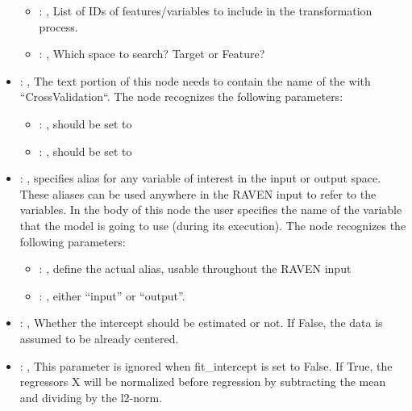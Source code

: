 \begin{itemize}
\begin{itemize}
        \item {}: , 
          List of IDs of features/variables to include in the transformation process.

        \item {}: , 
          Which space to search? Target or Feature?
      \end{itemize}

    \item {}: , 
      The text portion of this node needs to contain the name of the  with
               ``CrossValidation``.
      The  node recognizes the following parameters:
        \begin{itemize}
          \item {}: , 
            should be set to 
          \item {}: , 
            should be set to 
      \end{itemize}

    \item {}: , 
      specifies alias for         any variable of interest in the input or output space. These
      aliases can be used anywhere in the RAVEN input to         refer to the variables. In the body
      of this node the user specifies the name of the variable that the model is going to use
      (during its execution).
      The  node recognizes the following parameters:
        \begin{itemize}
          \item {}: , 
            define the actual alias, usable throughout the RAVEN input
          \item {}: , 
            either ``input'' or ``output''.
      \end{itemize}

    \item {}: , 
      Whether the intercept should be estimated or not. If False,
      the data is assumed to be already centered.

    \item {}: , 
      This parameter is ignored when fit\_intercept is set to False. If True,
      the regressors X will be normalized before regression by subtracting the mean and
      dividing by the l2-norm.
  \end{itemize}


